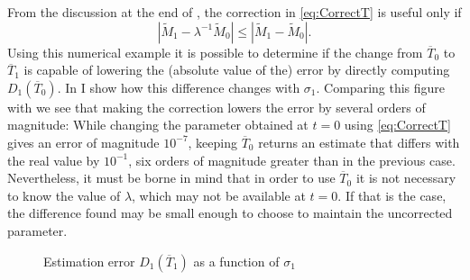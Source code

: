 \documentclass[english, a4paper, 12pt]{article}
\begin{document}
From the discussion at the end of , the correction in \eqref{eq:CorrectT} is useful only if
	$$\left|\tilde{M}_{1} - \lambda^{-1}\tilde{M}_{0} \right|
			\leq \left|\tilde{M}_{1} - \tilde{M}_{0} \right|.$$
Using this numerical example it is possible to determine if the change from $\overline{T}_{0}$ to $\overline{T}_{1}$ is capable of lowering the (absolute value of the) error by directly computing $D_{1}(\overline{T}_{0})$. In  I show how this difference changes with $\sigma_{1}$. Comparing this figure with  we see that making the correction lowers the error by several orders of magnitude: While changing the parameter obtained at $t = 0$ using \eqref{eq:CorrectT} gives an error of magnitude $10^{-7}$, keeping $\overline{T}_{0}$ returns an estimate that differs with the real value by $10^{-1}$, six orders of magnitude greater than in the previous case. Nevertheless, it must be borne in mind that in order to use $\overline{T}_{0}$ it is not necessary to know the value of $\lambda$, which may not be available at $t = 0$. If that is the case, the difference found may be small enough to choose to maintain the uncorrected parameter.
	\begin{figure}[H] 
		\caption{Estimation error $D_{1}(\overline{T}_{1})$ as a function of $\sigma_{1}$}
		\label{fig:CategoryDiff1Plot}
		\hspace{0.02\textwidth}
		
		\vspace{-1.5ex}
	\end{figure}
\end{document}
